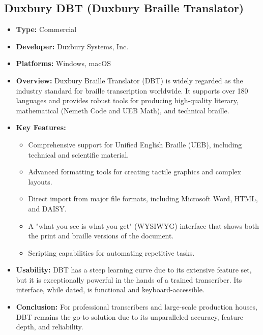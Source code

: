 \subsection{Duxbury DBT (Duxbury Braille Translator)}
\label{sub:duxbury-dbt-duxbury-braille-translator}

\begin{itemize}
	\item \textbf{Type:} Commercial
	\item \textbf{Developer:} Duxbury Systems, Inc.
	\item \textbf{Platforms:} Windows, macOS
	\item \textbf{Overview:} Duxbury Braille Translator (DBT) \supercite{Duxbury} is widely regarded as the industry standard for braille transcription worldwide. It supports over 180 languages and provides robust tools for producing high-quality literary, mathematical (Nemeth Code and UEB Math), and technical braille.
	\item \textbf{Key Features:}
	      \begin{itemize}
		      \item Comprehensive support for Unified English Braille (UEB), including technical and scientific material.
		      \item Advanced formatting tools for creating tactile graphics and complex layouts.
		      \item Direct import from major file formats, including Microsoft Word, HTML, and DAISY.
		      \item A "what you see is what you get" (WYSIWYG) interface that shows both the print and \gls{braille} versions of the document.
		      \item Scripting capabilities for automating repetitive tasks.
	      \end{itemize}
	\item \textbf{Usability:} DBT has a steep learning curve due to its extensive feature set, but it is exceptionally powerful in the hands of a trained transcriber. Its interface, while dated, is functional and keyboard-accessible.
	\item \textbf{Conclusion:} For professional transcribers and large-scale production houses, DBT remains the go-to solution due to its unparalleled accuracy, feature depth, and reliability.
\end{itemize}

